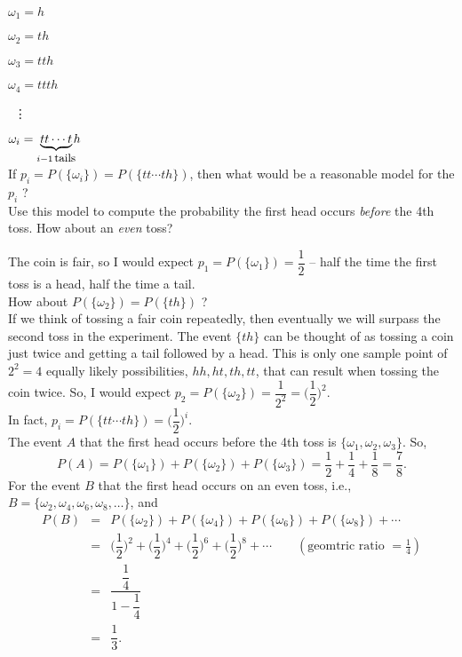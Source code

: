 \documentclass[12pt]{article}
\begin{document}
\qquad $\omega_1 = h$

\qquad $\omega_2 = th$

\qquad $\omega_3 = tth$

\qquad $\omega_4 = ttth$

\qquad \quad \, \vdots

\qquad $\omega_i = \underbrace{tt\cdots t}_{i-1\,\mbox{\small tails}}\!\!h$\\
\noindent If $p_i=P(\{\omega_i\}) = P(\{tt\cdots th\})$, then what would be a reasonable model for the $p_i$ ?\\
Use this model to compute the probability the first head occurs {\em before} the 4th toss. How about an {\em even} toss?


\newpage




\noindent The coin is fair, so I would expect $p_1=P(\{\omega_1\})=\dfrac 12$ -- half the time the first toss is a head, half the time a tail.\\

\noindent How about $P(\{\omega_2\})=P(\{th\})$ ?\\

\noindent If we think of tossing a fair coin repeatedly, then eventually we will surpass the second toss in the experiment. The event $\{th\}$
can be thought of as tossing a coin just twice and getting a tail followed by a head.  This is only one sample point of $2^2=4$ equally likely possibilities,
$hh,ht,th,tt$, that can result
when tossing the coin twice. So, I would expect $p_2=P(\{\omega_2\}) = \dfrac 1{2^2} = \Big(\dfrac 12\Big)^2$.\\

\noindent In fact, $p_i = P(\{tt\cdots th\}) = \Big(\dfrac 12\Big)^i$.\\

\noindent The event $A$ that the first head occurs before the 4th toss is $\{\omega_1,\omega_2,\omega_3\}$. So,
$$P(A) = P(\{\omega_1\})+P(\{\omega_2\})+P(\{\omega_3\}) = \frac 12 + \frac 14 + \frac 18 = \frac 78.$$
For the event $B$ that the first head occurs on an even toss,
i.e., $B = \{\omega_2,\omega_4,\omega_6,\omega_8,\dots\}$, and
\begin{eqnarray*}
P(B)
&=& P(\{\omega_2\}) + P(\{\omega_4\}) + P(\{\omega_6\}) + P(\{\omega_8\}) + \cdots \\
&=& \Big(\dfrac 12\Big)^2 + \Big(\dfrac 12\Big)^4 + \Big(\dfrac 12\Big)^6 + \Big(\dfrac 12\Big)^8 + \cdots \qquad(\mbox{geomtric ratio $=\frac 14$})\\
&=& \dfrac {\dfrac 14}{1 - \dfrac 14} \\
&=& \dfrac 13.\end{eqnarray*}
\end{document}
